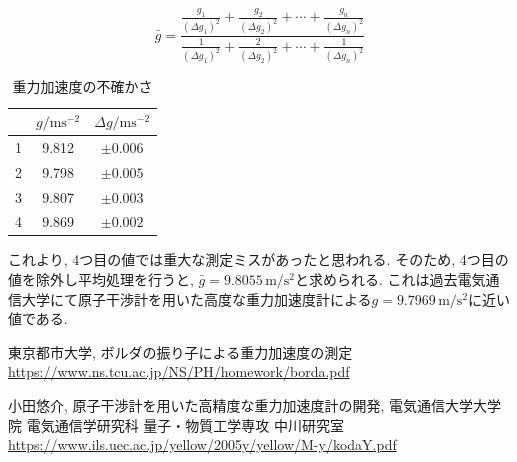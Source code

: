 \documentclass{jarticle}
\begin{document}
\begin{equation}
  \bar{g}=\frac{
    \frac{g_1}{(\Delta g_1)^2} + \frac{g_2}{(\Delta g_2)^2}+\cdots+\frac{g_n}{(\Delta g_n)^2}
  }{
    \frac{1}{(\Delta g_1)^2} + \frac{2}{(\Delta g_2)^2}+\cdots+\frac{1}{(\Delta g_n)^2}
  }
\end{equation}

\begin{table}[H]
  \centering
  \caption{重力加速度の不確かさ}
  \begin{tabular}{ccc}
    \hline
    & $g/\mathrm{ms^{-2}}$ & $\Delta g/\mathrm{ms^{-2}}$ \\
    \hline
    1 & 9.812 & $\pm 0.006$ \\
    2 & 9.798 & $\pm 0.005$ \\
    3 & 9.807 & $\pm 0.003$ \\
    4 & 9.869 & $\pm 0.002$ \\
    \hline
  \end{tabular}
\end{table}

これより, 4つ目の値では重大な測定ミスがあったと思われる.
そのため, 4つ目の値を除外し平均処理を行うと, $\bar{g}=9.8055\,\mathrm{m/s^2}$と求められる.
これは過去電気通信大学にて原子干渉計を用いた高度な重力加速度計による$g=9.7969\,\mathrm{m/s^2}$に近い値である.\cite{uec-atom}


\begin{thebibliography}{99}

  東京都市大学, ボルダの振り子による重力加速度の測定 \url{https://www.ns.tcu.ac.jp/NS/PH/homework/borda.pdf}

  小田悠介, 原子干渉計を用いた高精度な重力加速度計の開発, 電気通信大学大学院 電気通信学研究科 量子・物質工学専攻 中川研究室 \url{https://www.ils.uec.ac.jp/yellow/2005y/yellow/M-y/kodaY.pdf}

\end{thebibliography}
\end{document}
